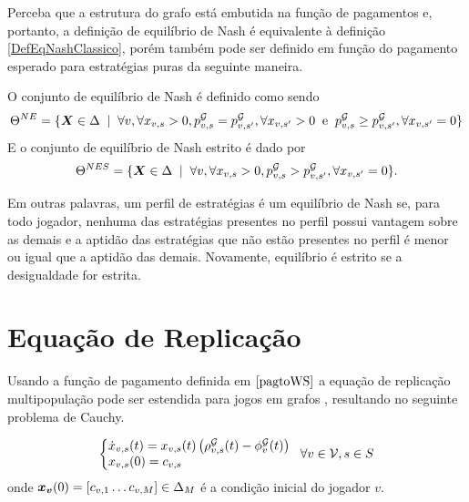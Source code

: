 Perceba que a estrutura do grafo está embutida na função de pagamentos e, portanto, a definição de equilíbrio de Nash é equivalente à definição \ref{DefEqNashClassico}, porém também pode ser definido em função do pagamento esperado para estratégias puras da seguinte maneira.

\begin{definition}
    \label{defEqNashEstPura}
    O conjunto de equilíbrio de Nash é definido como sendo
    \begin{equation*}
        \Theta^{NE}=\{\boldsymbol{X}\in\Delta\;\mid\;  \forall v,\forall x_{v,s}>0, p^{\mathcal{G}}_{v,s}=p^{\mathcal{G}}_{v,s'}, \forall x_{v,s'}>0 \;\;\text{e}\;\; p^{\mathcal{G}}_{v,s}\geq p^{\mathcal{G}}_{v,s'}, \forall x_{v,s'}=0\}
    \end{equation*}
    E o conjunto de equilíbrio de Nash estrito é dado por
    \begin{equation*}
        \Theta^{NES}=\{\boldsymbol{X}\in\Delta\;\mid\;  \forall v,\forall x_{v,s}>0, p^{\mathcal{G}}_{v,s}>p^{\mathcal{G}}_{v,s'}, \forall x_{v,s'}=0\}.
    \end{equation*}
\end{definition}

Em outras palavras, um perfil de estratégias é um equilíbrio de Nash se, para todo jogador, nenhuma das estratégias presentes no perfil possui vantagem sobre as demais e a aptidão das estratégias que não estão presentes no perfil é menor ou igual que a aptidão das demais. Novamente, equilíbrio é estrito se a desigualdade for estrita.


\section{Equação de Replicação}

Usando a função de pagamento definida em $\eqref{pagtoWS}$ a equação de replicação multipopulação pode ser estendida para jogos em grafos \cite{madeo2015}, resultando no seguinte problema de Cauchy.

\begin{equation}
    \label{EqRepEGN}
    \left\{\begin{matrix*}[l]
        \dot{x}_{v,s}(t)=x_{v,s}(t)\left(\rho^\G_{v,s}(t)-\phi^\G_v(t)\right)\\
        x_{v,s}(0)=c_{v,s}
    \end{matrix*}\right.
    \;\;\forall v\in\V,s\in S
\end{equation}
onde $\boldsymbol{x_v}(0)=[c_{v,1}\dots c_{v,M}]\in\Delta_M$ é a condição inicial do jogador $v$.

